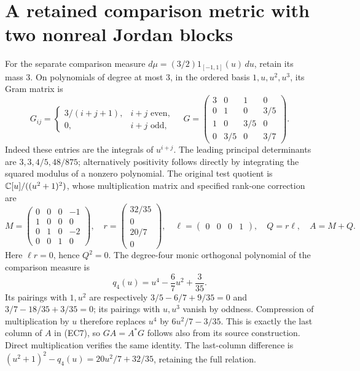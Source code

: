 \section{A retained comparison metric with two nonreal Jordan blocks}

For the separate comparison measure
\(d\mu=(3/2)1_{[-1,1]}(u)\,du\), retain its mass \(3\).
On polynomials of degree at most \(3\), in the ordered basis
\(1,u,u^2,u^3\), its Gram matrix is
\begin{equation}
 G_{ij}=
 \begin{cases}3/(i+j+1),&i+j\text{ even},\\0,&i+j\text{ odd},\end{cases}
 \quad
 G=\begin{pmatrix}
 3&0&1&0\\0&1&0&3/5\\1&0&3/5&0\\0&3/5&0&3/7
 \end{pmatrix}.
 \tag{EC6}
\end{equation}
Indeed these entries are the integrals of \(u^{i+j}\).
The leading principal determinants are
\(3,3,4/5,48/875\); alternatively positivity follows
directly by integrating the squared modulus of a nonzero polynomial.
The original test quotient is \(\mathbb C[u]/((u^2+1)^2)\), whose
multiplication matrix and specified rank-one correction are
\begin{equation}
 M=\begin{pmatrix}
 0&0&0&-1\\1&0&0&0\\0&1&0&-2\\0&0&1&0
 \end{pmatrix},\quad
 r=\begin{pmatrix}32/35\\0\\20/7\\0\end{pmatrix},\quad
 \ell=\begin{pmatrix}0&0&0&1\end{pmatrix},\quad
 Q=r\ell,\quad A=M+Q.
 \tag{EC7}
\end{equation}
Here \(\ell r=0\), hence \(Q^2=0\).
The degree-four monic orthogonal polynomial of the comparison measure is
\[
 q_4(u)=u^4-\frac67u^2+\frac3{35}.
\]
Its pairings with \(1,u^2\) are respectively
\(3/5-6/7+9/35=0\) and
\(3/7-18/35+3/35=0\); its pairings with \(u,u^3\)
vanish by oddness. Compression of multiplication by \(u\)
therefore replaces \(u^4\) by \(6u^2/7-3/35\).
This is exactly the last column of \(A\) in (EC7), so
\(GA=A^*G\) follows also from its source construction.
Direct multiplication verifies the same identity.
The last-column difference is
\((u^2+1)^2-q_4(u)=20u^2/7+32/35\), retaining the full relation.

